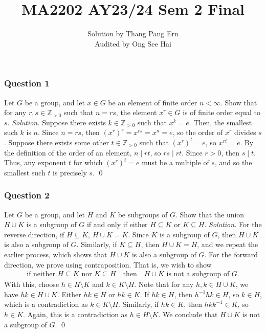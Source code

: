 \documentclass[12pt]{article}
\title{MA2202 AY23/24 Sem 2 Final}
\author{
  Solution by Thang Pang Ern\\
  Audited by Ong See Hai
}
\date{}
\begin{document}
\maketitle
\subsubsection*{Question 1}
Let $G$ be a group, and let $x\in G$ be an element of finite order $n<\infty$. Show that for any $r,s\in\mathbb{Z}_{>0}$ such that $n=rs$, the element $x^r\in G$ is of finite order equal to $s$.
\newline
\newline\textit{Solution.}  Suppose there exists $k\in\mathbb{Z}_{>0}$ such that $x^k=e$. Then, the smallest such $k$ is $n$. Since $n=rs$, then $\left(x^r\right)^s=x^{rs}=x^n=e$, so the order of $x^{r}$ divides $s$. Suppose there exists some other $t\in\mathbb{Z}_{>0}$ such that $\left(x^r\right)^t=e$, so $x^{rt}=e$. By the definition of the order of an element, $n\mid rt$, so $rs\mid rt$.
\newline
\newline Since $r>0$, then $s\mid t$. Thus, any exponent $t$ for which $\left(x^r\right)^t=e$ must be a multiple of $s$, and so the smallest such $t$ is precisely $s$. \qed 
\subsubsection*{Question 2}
Let $G$ be a group, and let $H$ and $K$ be subgroups of $G$. Show that the union $H\cup K$ is a subgroup of $G$ if and only if either $H\subseteq K$ or $K\subseteq H$.
\newline
\newline\textit{Solution.} For the reverse direction, if $H\subseteq K$, $H\cup K=K$. Since $K$ is a subgroup of $G$, then $H\cup K$ is also a subgroup of $G$. Similarly, if $K\subseteq H$, then $H\cup K=H$, and we repeat the earlier process, which shows that $H\cup K$ is also a subgroup of $G$.
\newline
\newline For the forward direction, we prove using contraposition. That is, we wish to show \begin{align*}
    \text{if neither }H\subseteq K\text{ nor }K\subseteq H\quad\text{then}\quad H\cup K\text{ is not a subgroup of }G.
\end{align*}
With this, choose $h\in H\setminus K$ and $k\in K\setminus H$. Note that for any $h,k\in H\cup K$, we have $hk\in H\cup K$. Either $hk\in H$ or $hk\in K$. If $hk\in H$, then $h^{-1}hk\in H$, so $k\in H$, which is a contradiction as $k\in K\setminus H$. Similarly, if $hk\in K$, then $hkk^{-1}\in K$, so $h\in K$. Again, this is a contradiction as $h\in H\setminus K$. We conclude that $H\cup K$ is not a subgroup of $G$. \qed 
\newpage
\end{document}
